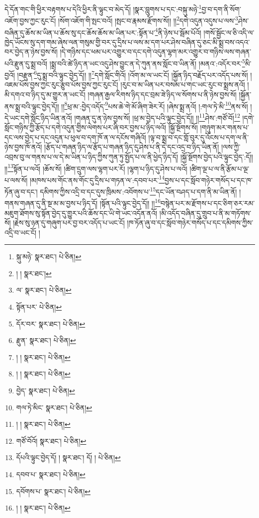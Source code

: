 དེ་དོན་གང་གི་ཕྱིར་བརྟགས་པ་དེའི་ཕྱིར་ནི་ལྟུང་བ་མེད་དོ། །སྣར་བླུགས་པ་དང་:བསྐུ་མཉེ་\footnote{སྐུ་མཉེ་  སྣར་ཐང་།  པེ་ཅིན། }བྱ་བ་དག་ནི་སོག་འཇོག་བྱས་ཀྱང་རུང་ངོ། །སོག་འཇོག་གི་སྤང་བའོ། །སྤང་བ་རྣམས་རྫོགས་སོ།། །།\footnote{། །  སྣར་ཐང་། }དགེ་འདུན་འདུས་པ་ལས་\footnote{ལ་  སྣར་ཐང་།  པེ་ཅིན། }ཤེས་བཞིན་དུ་ཆོས་མ་ཡིན་པ་ཆོས་སུ་དང་ཆོས་ཆོས་མ་ཡིན་པར་:སྟོན་པ་\footnote{སྟོན་པར་  པེ་ཅིན། }ནི་ཉེས་པ་སྦོམ་པོའོ། །གསོ་སྦྱོང་ལ་ཅི་འདི་ལ་ཁྱེད་ཡོངས་སུ་དག་གམ་ཞེས་ལན་གསུམ་གྱི་བར་དུ་དྲིས་པ་ལས་མ་དག་པར་ཤེས་བཞིན་དུ་ཅང་མི་སྨྲ་བས་འདའ་བར་བྱེད་ན་ཉེས་བྱས་སོ། །དེ་གཉིས་དང་ཕམ་པར་འགྱུར་བ་དང་དགེ་འདུན་ལྷག་མར་འགྱུར་བ་གཉིས་ལས་གཞན་པའི་རྫུན་དུ་སྨྲ་བའོ། །སྨྲ་བའི་ཚེ་ཉིད་ན་ཡང་འདུ་ཤེས་བྱུང་ན་དེ་ཀུན་ནས་སློང་བ་ཡིན་ནོ། །མནའ་:འདོར་བར་\footnote{དོར་བར་  སྣར་ཐང་།  པེ་ཅིན། }མི་བྱའོ། །བརྫུན་\footnote{རྫུན་  སྣར་ཐང་།  པེ་ཅིན། }དུ་སྨྲ་བའི་ལྟུང་བྱེད་དོ།། །།\footnote{། །  སྣར་ཐང་།  པེ་ཅིན། }དགེ་སློང་གིའོ། །འོག་མ་ལ་ཡང་ངོ། །སྐྱོན་ཉིད་བརྗོད་པར་འདོད་པས་སོ། །འཇམ་པོས་བྱས་ཀྱང་རུང་རྩུབ་པོས་བྱས་ཀྱང་རུང་ངོ། །རུང་བ་མ་ཡིན་པར་བསམ་པ་གང་ཡང་རུང་བ་སྨྲས་ནའོ། །མི་དགའ་བ་ཉིད་དུ་མ་གྱུར་ན་ཡང་ངོ། །གཞན་རྒྱལ་རིགས་ཉིད་དང་བྲམ་ཟེ་ཉིད་ལ་སོགས་པ་ནི་ཉེས་བྱས་སོ། །སྐྱོན་ནས་སྨྲ་བའི་ལྟུང་བྱེད་དོ།། །།\footnote{། །  སྣར་ཐང་།  པེ་ཅིན། }ཕྲ་མ་:བྱེད་འདོད་\footnote{བྱེད་  སྣར་ཐང་།  པེ་ཅིན། }པས་ཆེ་གེ་མོ་ཞིག་ཟེར་རོ། །ཞེས་སྨྲ་ནའོ། །:གལ་ཏེ་མི་\footnote{གལ་ཏེ་མིང་  སྣར་ཐང་།  པེ་ཅིན། }ནས་སོ། །དེ་ཡང་དགེ་སློང་ཉིད་ཡིན་ནའོ། །གཞན་དུ་ན་ཉེས་བྱས་སོ། །ཕྲ་མ་བྱེད་པའི་ལྟུང་བྱེད་དོ།། །།\footnote{། །  སྣར་ཐང་།  པེ་ཅིན། }ཤེས་:གཙོ་བོ།\footnote{གཙོ་བོའོ།  སྣར་ཐང་།  པེ་ཅིན། } །དགེ་སློང་གཉིས་ཀྱི་རྩོད་པ་དགེ་འདུན་གྱིས་ལེགས་པར་ཞི་བར་བྱས་པ་ཉིད་ལའོ། །སྐྱོ་སྔོགས་སོ། །གཉུག་མར་གནས་པ་དང་ལས་བྱེད་པ་དང་འདུན་པ་ཕུལ་བ་དག་ཁོ་ན་ལ་དངོས་གཞིའོ། །ལྟ་བ་སྨྲ་བ་དང་གློ་བུར་དུ་འོངས་པ་དག་ལ་ནི་ཉེས་བྱས་ཁོ་ནའོ། །རྩོད་པ་གཞན་ཉིད་ལ་རྩོད་པ་གཞན་ཉིད་དུ་ཤེས་པ་ནི་དེ་དང་འདྲ་བ་ཉིད་ཡིན་ནོ། །ལས་ཀྱི་འབྲས་བུ་ལ་གནས་པ་ལ་དེ་མ་ཡིན་པ་ཉིད་ཀྱིས་ཀུན་ཏུ་སྤྱོད་པ་ལ་ནི་ཕྱེད་ཉིད་དོ། །སྐྱོ་སྔོགས་བྱེད་པའི་ལྟུང་བྱེད་:དོ།། །།\footnote{དོཔའི་ལྟུང་བྱེད་དོ། །  སྣར་ཐང་། དོ། །  པེ་ཅིན། }སྟོན་པ་ལའོ། །ཆོས་སོ། །ཚིག་དྲུག་ལས་ལྷག་པར་རོ། །ལྷག་པ་ཉིད་དུ་ཤེས་པ་ལའོ། །ཚིག་ལྔ་པ་ལ་ནི་རྩོམ་པ་ལྔ་པ་ལས་སོ། །མཁས་པས་གོང་ནས་གོང་དུ་དྲིས་པ་གཏན་ལ་:དབབ་པར་\footnote{དབབ་པ་  སྣར་ཐང་།  པེ་ཅིན། }བྱས་པ་དང་སློབ་གཉེར་གསོད་པ་དང་ཁ་ཏོན་ཞུ་བ་དང་། དམིགས་ཀྱིས་འདྲི་བ་དང་དུས་ཁྲིམས་:འབོགས་པ་\footnote{དབོགས་པ་  སྣར་ཐང་།  པེ་ཅིན། }དང་ཡོན་བཤད་པ་དག་ནི་མ་ཡིན་ནོ། །གནས་གཞན་དུ་ནི་སྔ་མ་མ་བྱས་པ་ཉིད་དོ། །སྟོན་པའི་ལྟུང་བྱེད་དོ།། །།\footnote{། །  སྣར་ཐང་།  པེ་ཅིན། }བསྙེན་པར་མ་རྫོགས་པ་དང་ཅིག་ཅར་རམ་མཇུག་ཐོགས་སུ་སྟོན་བྱེད་དུ་གྱུར་པའི་ཆོས་དང་ཡི་གེ་ཡང་འདོན་ནའོ། །མི་འདོད་བཞིན་དུ་གྲུབ་པ་ནི་མ་གཏོགས་སོ། །རྗེས་སུ་ཉན་དུ་གཞུག་པར་བྱ་བར་འདོད་པ་ཡང་ངོ། །ཁ་ཏོན་ཞུ་བ་དང་སློབ་གཉེར་གསོད་པ་དང་དམིགས་ཀྱིས་འདྲི་བ་ཡང་ངོ། །
